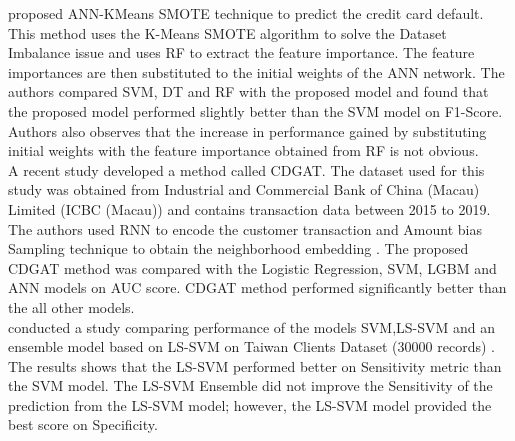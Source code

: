 \documentclass[twoside,11pt,a4paper]{article}
\begin{document}
\cite{chen2021research} proposed \acs{ANN}-KMeans \acs{SMOTE} technique to predict the credit card default. This method uses the K-Means \acs{SMOTE} algorithm to solve the Dataset Imbalance issue and uses \acs{RF} to extract the feature importance. The feature importances are then substituted to the initial weights of the \acs{ANN} network. The authors compared \acs{SVM}, \acs{DT} and \acs{RF} with the proposed model and found that the proposed model performed slightly better than the \acs{SVM} model on F1-Score. Authors also observes that the increase in performance gained by substituting initial weights with the feature importance obtained from \acs{RF} is not obvious.\\

A recent study \citep{wu2022cdgat} developed a method called \acf{CDGAT}. The dataset used for this study was obtained from  Industrial and Commercial Bank of China (Macau) Limited (ICBC (Macau)) and contains transaction data between 2015 to 2019. The authors used \acs{RNN} to encode the customer transaction  and Amount bias Sampling technique to obtain the neighborhood embedding . The proposed \acs{CDGAT} method was compared with the Logistic Regression, \acs{SVM}, \acs{LGBM} and \acs{ANN}  models on \acs{AUC} score. \acs{CDGAT} method performed significantly better than the all other models. \\

\citep{lawi2018classification} conducted a study comparing performance of the models \acs{SVM},\acf{LS-SVM} \citep{suykens1999least}  and an ensemble model based on \acs{LS-SVM}  on Taiwan Clients Dataset (30000 records) \citep{yeh2009comparisons}. The results shows that the \acs{LS-SVM} performed better on Sensitivity metric than the \acs{SVM} model. The \acs{LS-SVM} Ensemble did not improve the Sensitivity of the prediction from the \acs{LS-SVM} model; however, the \acs{LS-SVM} model provided the best score on Specificity. \\
\end{document}
